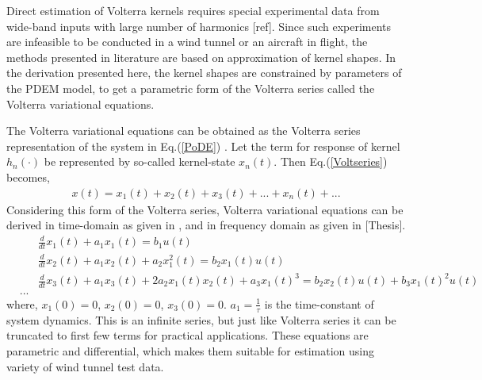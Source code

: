 \documentclass{AIAA}
\begin{document}
Direct estimation of Volterra kernels requires special experimental data from wide-band inputs with large number of harmonics [ref]. Since such experiments are infeasible to be conducted in a wind tunnel or an aircraft in flight, the methods presented in literature are based on approximation of kernel shapes. In the derivation presented here, the kernel shapes are constrained by parameters of the PDEM model, to get a parametric form of the Volterra series called the Volterra variational equations.

The Volterra variational equations can be obtained as the Volterra series representation of the system in Eq.(\ref{PoDE}) \cite{Rugh}. Let the term for response of kernel $h_n(\cdot)$ be represented by so-called kernel-state $x_n(t)$. Then Eq.(\ref{Voltseries}) becomes,
\begin{eqnarray}
x(t) = x_1(t)+x_2(t)+x_3(t)+...+x_n(t)+...
\end{eqnarray}
Considering this form of the Volterra series, Volterra variational equations can be derived in time-domain as given in \cite{Rugh}, and in frequency domain as given in [Thesis].
\begin{eqnarray}
\label{eq:VVM_1}&&\frac{d}{dt}x_1(t) +a_1 x_1(t)= b_1 u(t)\\
\label{eq:VVM_2}&&\frac{d}{dt}x_2(t)+a_1 x_2(t)+ a_2x_1^{2}(t)= b_2 x_1(t) u(t)\\
\label{eq:VVM_3} &&\frac{d}{dt}x_3(t)+a_1 x_3(t)+ 2 a_2x_1(t)x_2(t)+ a_3 x_1(t)^{3}= b_2 x_2(t)u(t)+ b_3 x_1(t)^2 u(t)\\ \nonumber
&...
\end{eqnarray}
where, $x_1(0)=0$, $x_2(0)=0$, $x_3(0)=0$. $a_1=\frac{1}{\tau}$ is the time-constant of system dynamics. This is an infinite series, but just like Volterra series it can be truncated to first few terms for practical applications. These equations are parametric and differential, which makes them suitable for estimation using variety of wind tunnel test data. 
\end{document}
